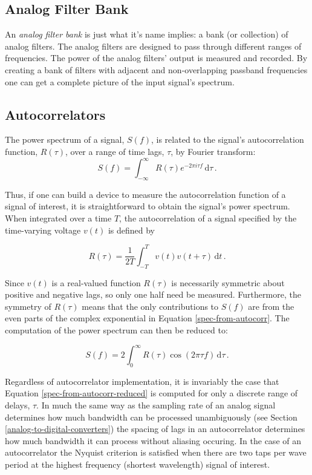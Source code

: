 \documentclass{article}
\begin{document}
\subsection{Analog Filter Bank}\label{analog-filter-bank}

An \emph{analog filter bank} is just what it's name implies: a bank (or
collection) of analog filters. The analog filters are designed to pass
through different ranges of frequencies. The power of the analog
filters' output is measured and recorded. By creating a bank of filters
with adjacent and non-overlapping passband frequencies one can get a
complete picture of the input signal's spectrum.

\subsection{Autocorrelators}\label{autocorrelators}
The power spectrum of a signal, $S(f)$,  is related to the signal's autocorrelation function, $R(\tau)$, over a range of time lags, $\tau$, by Fourier transform:
\begin{equation}
\label{spec-from-autocorr}
 S(f) = \int_{-\infty}^{\infty} R(\tau)e^{-2\pi i \tau f} \,\mathrm{d}\tau \,.
\end{equation}

Thus, if one can build a device to measure the autocorrelation function of a signal of interest, it is straightforward to obtain the signal's power spectrum.
When integrated over a time $T$, the autocorrelation of a signal specified by the time-varying voltage $v(t)$ is defined by 

\begin{equation}
\label{autocorr}
 R(\tau) = \frac{1}{2T} \int_{-T}^{T} v(t)v(t+\tau) \,\mathrm{d}t \,.
\end{equation}

Since $v(t)$ is a real-valued function $R(\tau)$ is necessarily symmetric about positive and negative lags, so only one half need be measured. Furthermore, the symmetry of $R(\tau)$ means that the only contributions to $S(f)$ are from the even parts of the complex exponential in Equation \ref{spec-from-autocorr}. The computation of the power spectrum can then be reduced to:

\begin{equation}
\label{spec-from-autocorr-reduced}
 S(f) = 2\int_{0}^{\infty} R(\tau)\cos{(2\pi \tau f)} \,\mathrm{d}\tau \,.
\end{equation}

Regardless of autocorrelator implementation, it is invariably the case that Equation \ref{spec-from-autocorr-reduced} is computed for only a discrete range of delays, $\tau$. In much the same way as the sampling rate of an analog signal determines how much bandwidth can be processed unambiguously (see Section \ref{analog-to-digital-converters}) the spacing of lags in an autocorrelator determines how much bandwidth it can process without aliasing occuring. In the case of an autocorrelator the Nyquist criterion is satisfied when there are two taps per wave period at the highest frequency (shortest wavelength) signal of interest. 
\end{document}
